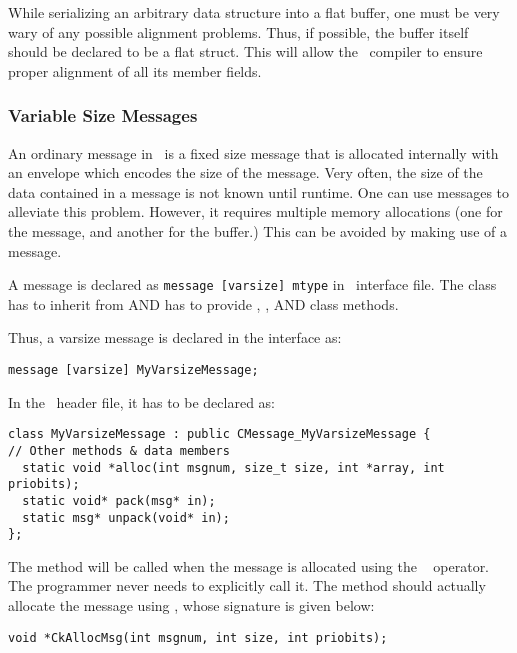 While serializing an arbitrary data structure into a flat buffer, one
must be very wary of any possible alignment problems.  Thus, if
possible, the buffer itself should be declared to be a flat struct.
This will allow the \CC\ compiler to ensure proper alignment of all
its member fields.


\subsubsection{Variable Size Messages}
\label{varsize messages}

An ordinary message in \charmpp\ is a fixed size message that is
allocated internally with an envelope which encodes the size of the
message. Very often, the size of the data contained in a message is
not known until runtime. One can use  messages to alleviate 
this problem. However, it requires multiple memory allocations (one
for the message, and another for the buffer.) This can be avoided by
making use of a  message.

A  message is declared as {\tt message [varsize] mtype} in
\charmpp\ interface file. The class  has to inherit from
 AND has to provide ,
, AND
 class methods.

Thus, a varsize message is declared in the interface as: 

\verb+message [varsize] MyVarsizeMessage;+ 

In the \CC\ header file, it has to be declared as: 

\begin{verbatim}
class MyVarsizeMessage : public CMessage_MyVarsizeMessage { 
// Other methods & data members 
  static void *alloc(int msgnum, size_t size, int *array, int priobits); 
  static void* pack(msg* in); 
  static msg* unpack(void* in); 
}; 
\end{verbatim}

The  method will be called when the message is allocated using
the \CC\  operator. The programmer never needs to explicitly
call it.
The  method should actually allocate the message using
, whose signature is given below:

\begin{verbatim}
void *CkAllocMsg(int msgnum, int size, int priobits); 
\end{verbatim}  

